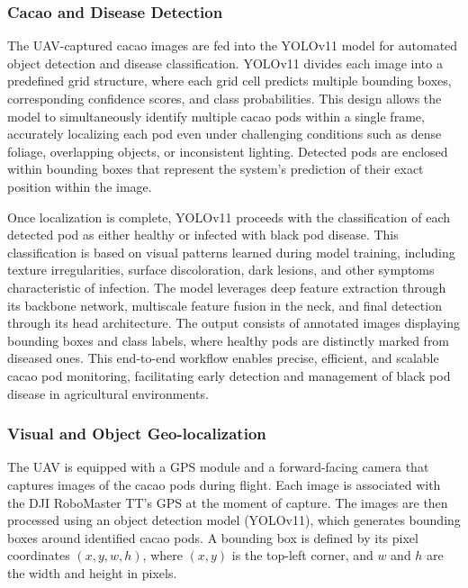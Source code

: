 \subsubsection*{Cacao and Disease Detection}

The UAV-captured cacao images are fed into the YOLOv11 model for automated object detection and disease classification. YOLOv11 divides each image into a predefined grid structure, where each grid cell predicts multiple bounding boxes, corresponding confidence scores, and class probabilities. This design allows the model to simultaneously identify multiple cacao pods within a single frame, accurately localizing each pod even under challenging conditions such as dense foliage, overlapping objects, or inconsistent lighting. Detected pods are enclosed within bounding boxes that represent the system’s prediction of their exact position within the image.

Once localization is complete, YOLOv11 proceeds with the classification of each detected pod as either healthy or infected with black pod disease. This classification is based on visual patterns learned during model training, including texture irregularities, surface discoloration, dark lesions, and other symptoms characteristic of infection. The model leverages deep feature extraction through its backbone network, multiscale feature fusion in the neck, and final detection through its head architecture. The output consists of annotated images displaying bounding boxes and class labels, where healthy pods are distinctly marked from diseased ones. This end-to-end workflow enables precise, efficient, and scalable cacao pod monitoring, facilitating early detection and management of black pod disease in agricultural environments.


\subsubsection*{Visual and Object Geo-localization}

The UAV is equipped with a GPS module and a forward-facing camera that captures images of the cacao pods during flight. Each image is associated with the DJI RoboMaster TT’s GPS at the moment of capture. The images are then processed using an object detection model (YOLOv11), which generates bounding boxes around identified cacao pods. A bounding box is defined by its pixel coordinates $(x, y, w, h)$, where $(x, y)$ is the top-left corner, and $w$ and $h$ are the width and height in pixels.

